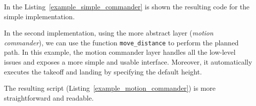 In the Listing~\ref{example_simple_commander} is shown the resulting code for the simple implementation.

In the second implementation, using the more abstract layer (\textit{motion commander}), we can use the function \verb|move_distance| to perform the planned path.
In this example, the motion commander layer handles all the low-level issues and exposes a more simple and usable interface. 
Moreover, it automatically executes the takeoff and landing by specifying the default height.

The resulting script (Listing~\ref{example_motion_commander}) is more straightforward and readable.

\begin{figure}[t]
    \centering
    
\end{figure}
\begin{figure}[b]
    \centering
    
\end{figure}
